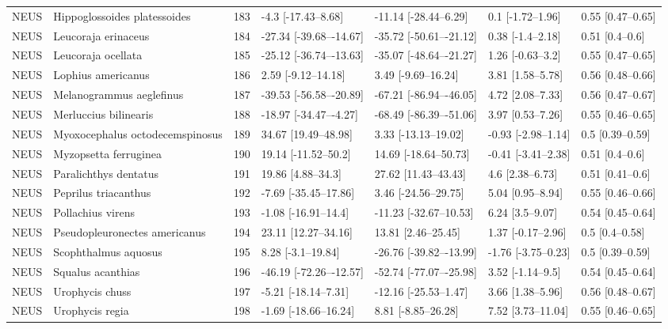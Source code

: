 \begin{longtable}[t]{lllllll}
NEUS & Hippoglossoides platessoides & 183 & -4.3 [-17.43–8.68] & -11.14 [-28.44–6.29] & 0.1 [-1.72–1.96] & 0.55 [0.47–0.65]\\
NEUS & Leucoraja erinaceus & 184 & -27.34 [-39.68–-14.67] & -35.72 [-50.61–-21.12] & 0.38 [-1.4–2.18] & 0.51 [0.4–0.6]\\
NEUS & Leucoraja ocellata & 185 & -25.12 [-36.74–-13.63] & -35.07 [-48.64–-21.27] & 1.26 [-0.63–3.2] & 0.55 [0.47–0.65]\\
\addlinespace
NEUS & Lophius americanus & 186 & 2.59 [-9.12–14.18] & 3.49 [-9.69–16.24] & 3.81 [1.58–5.78] & 0.56 [0.48–0.66]\\
NEUS & Melanogrammus aeglefinus & 187 & -39.53 [-56.58–-20.89] & -67.21 [-86.94–-46.05] & 4.72 [2.08–7.33] & 0.56 [0.47–0.67]\\
NEUS & Merluccius bilinearis & 188 & -18.97 [-34.47–-4.27] & -68.49 [-86.39–-51.06] & 3.97 [0.53–7.26] & 0.55 [0.46–0.65]\\
NEUS & Myoxocephalus octodecemspinosus & 189 & 34.67 [19.49–48.98] & 3.33 [-13.13–19.02] & -0.93 [-2.98–1.14] & 0.5 [0.39–0.59]\\
NEUS & Myzopsetta ferruginea & 190 & 19.14 [-11.52–50.2] & 14.69 [-18.64–50.73] & -0.41 [-3.41–2.38] & 0.51 [0.4–0.6]\\
\addlinespace
NEUS & Paralichthys dentatus & 191 & 19.86 [4.88–34.3] & 27.62 [11.43–43.43] & 4.6 [2.38–6.73] & 0.51 [0.41–0.6]\\
NEUS & Peprilus triacanthus & 192 & -7.69 [-35.45–17.86] & 3.46 [-24.56–29.75] & 5.04 [0.95–8.94] & 0.55 [0.46–0.66]\\
NEUS & Pollachius virens & 193 & -1.08 [-16.91–14.4] & -11.23 [-32.67–10.53] & 6.24 [3.5–9.07] & 0.54 [0.45–0.64]\\
NEUS & Pseudopleuronectes americanus & 194 & 23.11 [12.27–34.16] & 13.81 [2.46–25.45] & 1.37 [-0.17–2.96] & 0.5 [0.4–0.58]\\
NEUS & Scophthalmus aquosus & 195 & 8.28 [-3.1–19.84] & -26.76 [-39.82–-13.99] & -1.76 [-3.75–0.23] & 0.5 [0.39–0.59]\\
\addlinespace
NEUS & Squalus acanthias & 196 & -46.19 [-72.26–-12.57] & -52.74 [-77.07–-25.98] & 3.52 [-1.14–9.5] & 0.54 [0.45–0.64]\\
NEUS & Urophycis chuss & 197 & -5.21 [-18.14–7.31] & -12.16 [-25.53–1.47] & 3.66 [1.38–5.96] & 0.56 [0.48–0.67]\\
NEUS & Urophycis regia & 198 & -1.69 [-18.66–16.24] & 8.81 [-8.85–26.28] & 7.52 [3.73–11.04] & 0.55 [0.46–0.65]\\

\end{longtable}
